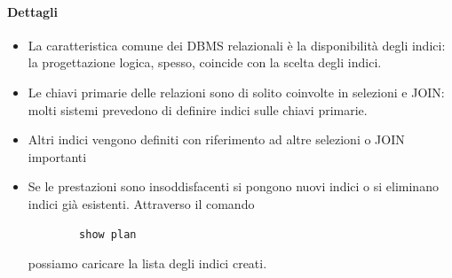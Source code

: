 \paragraph{Dettagli}
\begin{itemize}
	\item La caratteristica comune dei DBMS relazionali è la disponibilità degli indici: la progettazione logica, spesso, coincide con la scelta degli indici.
	\item Le chiavi primarie delle relazioni sono di solito coinvolte in selezioni e JOIN: molti sistemi prevedono di definire indici sulle chiavi primarie.
	\item Altri indici vengono definiti con riferimento ad altre selezioni o JOIN importanti
	\item Se le prestazioni sono insoddisfacenti si pongono nuovi indici o si eliminano indici già esistenti. Attraverso il comando
	\begin{verbatim}
		show plan
	\end{verbatim}
	possiamo caricare la lista degli indici creati.
\end{itemize}